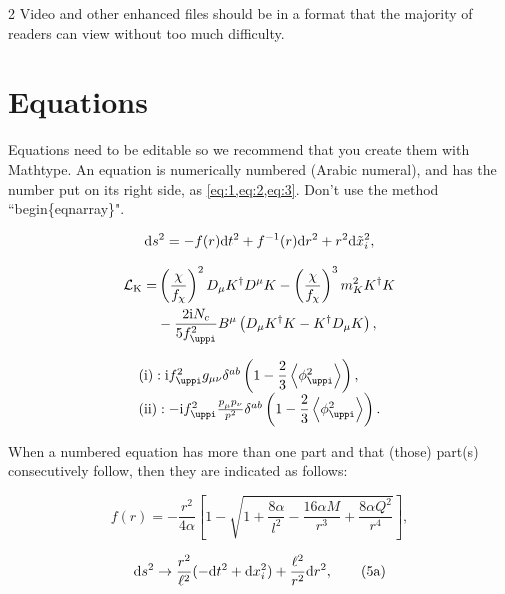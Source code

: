 \documentclass[fleqn]{2026SCGE}
\begin{document}
\begin{multicols}{2}
Video and other enhanced files should be in a format that the majority of readers can view without too much difficulty.


\section{Equations}\label{sec:7}
Equations need to be editable so we recommend that you create them with Mathtype. An equation is numerically numbered (Arabic numeral), and has the number put on its right side, as \cref{eq:1,eq:2,eq:3}. Don't use the method ``begin\{eqnarray\}".


\begin{equation}
	\textmd{d}s^{2}=-f(r)\textmd{d}t^{2}+f^{-1}(r)\textmd{d}r^{2}+r^{2}\textmd{d}\tilde{x}_i^{2},
	\label{eq:1}
\end{equation}

\begin{align}
	{\cal L}_{\rm K}  = & \left(\frac{\chi}{f_\chi}\right)^2D_\mu K^\dagger D^\mu K - \left(\frac{\chi}{f_\chi}\right)^3m_K^2 K^\dagger K \nonumber\\
	& - \frac{2{\rm i}N_c}{5f_\uppi^2} {B}^\mu \left(D_\mu K^\dagger K - K^\dagger D_\mu K\right),
	\label{eq:2}
\end{align}

\begin{align}
	\begin{array}{l}
		{\rm (i)} :  {\rm i} f_\uppi^2 g_{\mu\nu} \delta^{ab}
		\left(1-\dfrac{2}{3}\left\langle\bm{\phi}_\uppi^2\right\rangle \right),\\[4pt]
		{\rm (ii)} :
		- {\rm i} f_\uppi^2 \frac{p_\mu^{} p_\nu}{p^2} \delta^{ab}\left(1-\dfrac{2}{3}\left\langle {\bm\phi}_\uppi^2\right\rangle \right) .
	\end{array}
	\label{eq:3}
\end{align}

When a numbered equation has more than one part and that (those) part(s) consecutively follow, then they are indicated as follows:

\begin{equation}
	f(r)=-\frac{r^2}{4\alpha}\left[1-\sqrt{1+\frac{8\alpha}{l^2}-\frac{16\alpha  M}{r^3}+\frac{8\alpha Q^2}{r^4}}\right], \tag {4}
\end{equation}

\begin{equation}
	\textmd{d}s^2\rightarrow \frac{r^2}{\ell^2}(-\textmd{d}t^2+\textmd{d}x_i^2)+\frac{\ell^2}{r^2}\textmd{d}r^2, \tag {5a}
\end{equation}


\end{multicols}
\end{document}
